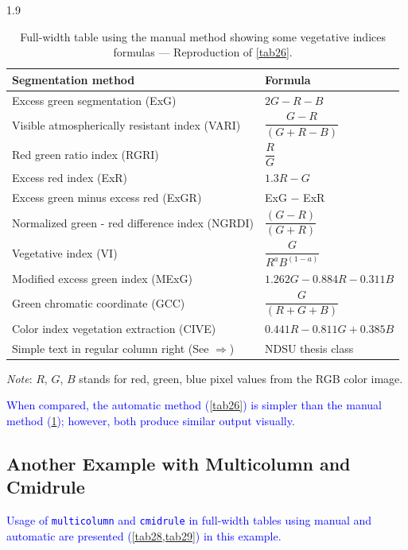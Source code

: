 \documentclass[phd]{ndsu-thesis-2022}
\newcommand\myspacing{1.9}      %
\newcommand\italk[1]{\textcolor{blue}{#1}}  %
\newcommand\vb[1]{\textcolor{blue}{\texttt{#1}}}%
\begin{document}
\begin{spacing}{\myspacing}
\begin{table}[ht]
\caption{Full-width table using the manual method showing some vegetative indices formulas --- Reproduction of \cref{tab26}.}
\setlength{\tabcolsep}{7ex}
\begin{tabular}{@{\:}l l@{\:}}
\toprule
Segmentation method  & Formula  \\
\midrule
Excess green segmentation (ExG)    				& $2G - R - B$\\[1ex]
Visible atmospherically resistant index (VARI) 		& $\dfrac{{G - R}}
{(G + R - B)}$ \\[2ex]
Red green ratio index (RGRI) 					& $\dfrac{R}{G}$\\[2ex]
Excess red index (ExR) 						& $1.3R - G$\\[2ex]
Excess green minus excess red (ExGR) 			& \text ExG $-$ ExR\\[2ex]
Normalized green - red difference index (NGRDI)	& $\dfrac{(G - R)}{(G + R)}$\\[2ex]
Vegetative index (VI) 						& $\dfrac{G}{R^a B^{(1-a)}}$\\[3ex]
Modified excess green index (MExG) 			& $ 1.262G - 0.884R - 0.311B$\\[2ex]
Green chromatic coordinate (GCC) 				& $\dfrac{G}{(R + G + B)}$\\[2ex]
Color index vegetation extraction (CIVE) 			& $0.441R - 0.811G + 0.385B$\\[2ex]
Simple text in regular column right (See $\Rightarrow$) & NDSU thesis class\\
\bottomrule
\end{tabular}
\begin{tablenotes}[flushleft]
\footnotesize
\item \hspace{-1ex} \emph{Note}: $R$, $G$, $B$ stands for red, green, blue pixel values from the RGB color image.
\label{tab27}
\end{tablenotes}
\end{table}

\italk{When compared, the automatic method (\cref{tab26}) is simpler than the manual method (\cref{tab27}); however, both produce similar output visually.} 

\subsection{Another Example with Multicolumn and Cmidrule}
\italk{Usage of \vb{multicolumn} and \vb{cmidrule} in full-width tables using manual and automatic are presented (\cref{tab28,tab29}) in this example.} 


\end{spacing}
\end{document}
